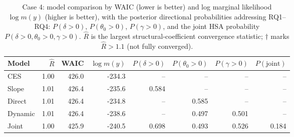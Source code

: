 \begin{table}[H]\centering\small
\caption{Case 4: model comparison by WAIC (lower is better) and log marginal likelihood $\log m(y)$ (higher is better), with the posterior directional probabilities addressing RQ1--RQ4: $P(\delta>0)$, $P(\theta_0>0)$, $P(\gamma>0)$, and the joint HSA probability $P(\delta>0,\theta_0>0,\gamma>0)$. $\hat R$ is the largest structural-coefficient convergence statistic; $\dagger$ marks $\hat R>1.1$ (not fully converged).}
\label{tab:case4_cmp}
\begin{tabular}{lrrrrrrr}\toprule
Model & $\hat R$ & WAIC & $\log m(y)$ & $P(\delta{>}0)$ & $P(\theta_0{>}0)$ & $P(\gamma{>}0)$ & $P(\text{joint})$ \\\midrule
CES & 1.00 & 426.0 & -234.3 & -- & -- & -- & -- \\
Slope & 1.01 & 426.4 & -235.6 & 0.584 & -- & -- & -- \\
Direct & 1.01 & 426.4 & -234.8 & -- & 0.585 & -- & -- \\
Dynamic & 1.01 & 426.4 & -238.6 & -- & 0.497 & 0.501 & -- \\
Joint & 1.00 & 425.9 & -240.5 & 0.698 & 0.493 & 0.526 & 0.184 \\
\bottomrule\end{tabular}\end{table}
